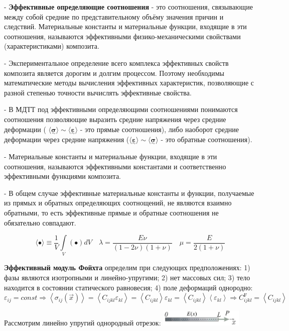 - \textbf{Эффективные определяющие соотношения} - это соотношения, связывающие между собой средние по представительному объёму значения причин и следствий. Материальные константы и материальные функции, входящие в эти соотношения, называются эффективными физико-механическими свойствами (характеристиками) композита.

- Экспериментальное определение всего комплекса эффективных свойств композита является дорогим и долгим процессом. Поэтому необходимы математические методы вычисления эффективных характеристик, позволяющие с разной степенью точности вычислять эффективные свойства.

- В МДТТ под эффективными определяющими соотношениями понимаются соотношения позволяющие выразить средние напряжения через средние деформации ( $\langle\underset{\sim}{\boldsymbol{\sigma}}\rangle \sim\langle\underset{\sim}{\boldsymbol{\varepsilon}}\rangle$ - это прямые соотношения), либо наоборот средние деформации через средние напряжения ($\langle\underset{\sim}{\boldsymbol{\varepsilon}}\rangle \sim\langle\underset{\sim}{\boldsymbol{\sigma}}\rangle$ - это обратные соотношения).

- Материальные константы и материальные функции, входящие в эти соотношения, называются эффективными константами и соответственно эффективными функциями композита.

- В общем случае эффективные материальные константы и функции, получаемые из прямых и обратных определяющих соотнощений, не являются взаимно обратными, то есть эффективные прямые и обратные соотношения не обязательно совпадают. 

$$
\langle\bullet\rangle \equiv \frac{1}{V} \int \limits_{V}(\bullet) d V \quad
\lambda=\frac{E \nu}{(1-2 \nu)(1+\nu)} \quad \mu=\frac{E}{2(1+\nu)}
$$

\textbf{Эффективный модуль Фойхта} определим при следующих предположениях: 1) фазы являются изотропными и линейно-упругими; 2) нет массовых сил; 3) тело находится в состоянии статического равновесия; 4) поле деформаций однородно:
$
\varepsilon_{ij}=const \Rightarrow
\left\langle\sigma_{i j}(\vec{x})\right\rangle=\left\langle C_{i j k l} \varepsilon_{k l}\right\rangle=\left\langle C_{i j k l}\right\rangle \varepsilon_{k l}=\left\langle C_{i j k l}\right\rangle\left\langle\varepsilon_{k l}\right\rangle \Rightarrow C_{i j k l}^{\mathrm{F}}=\left\langle C_{i j k l}\right\rangle
$

Рассмотрим линейно упругий однородный отрезок: 
\includegraphics[width=0.3\textwidth]{images/19.1.jpg}

